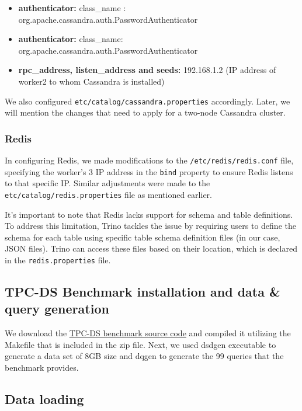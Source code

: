 \documentclass[conference]{IEEEtran}
\begin{document}
\begin{itemize}
    \item \textbf{authenticator:} class\_name : org.apache.cassandra.auth.PasswordAuthenticator
    \item \textbf{authenticator:}
        class\_name: org.apache.cassandra.auth.PasswordAuthenticator
    \item \textbf{rpc\_address, listen\_address and seeds:} 192.168.1.2 (IP address of worker2 to whom Cassandra is installed)
\end{itemize}

We also configured \texttt{etc/catalog/cassandra.properties} accordingly. Later, we will mention the changes that need to apply for a two-node Cassandra cluster.

\subsubsection{Redis}


In configuring Redis, we made modifications to the \texttt{/etc/redis/redis.conf} file, specifying the worker's 3 IP address in the \texttt{bind} property 
to ensure Redis listens to that specific IP. Similar adjustments were made to the \texttt{etc/catalog/redis.properties} file as mentioned earlier.

It's important to note that Redis lacks support for schema and table definitions. To address this limitation, Trino tackles the issue by requiring users to 
define the schema for each table using specific table schema definition files (in our case, JSON files). Trino can access these files based on their location, which is declared in the \texttt{redis.properties} file.

\subsection{TPC-DS Benchmark installation and data \& query generation}

We download the \textcolor{linkblue}{\underline{\href{https://www.tpc.org/tpc_documents_current_versions/current_specifications5.asp}{TPC-DS benchmark source code}}} and compiled it
utilizing the Makefile that is included in the zip file. Next, we used dsdgen executable to generate a data set of 8GB size and dqgen to generate the 99 queries that the benchmark provides.

\subsection{Data loading}
\end{document}
